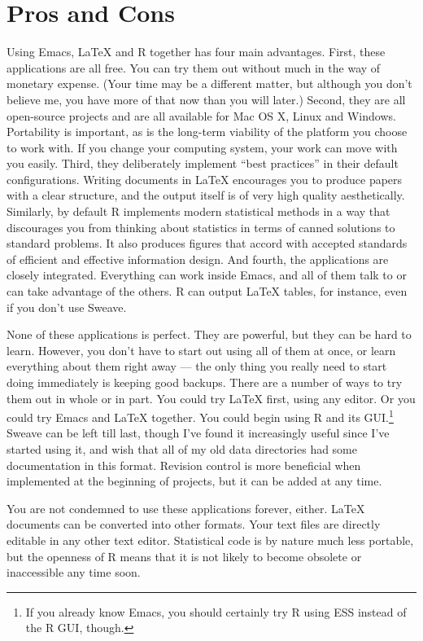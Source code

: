 \documentclass[11pt,article,oneside]{memoir}
\begin{document}
\section{Pros and Cons}  
Using Emacs, LaTeX and R together has four main advantages. First, these applications are all free. You can try them out without much in the way of monetary expense. (Your time may be a different matter, but although you don't believe me, you have more of that now than you will later.) Second, they are all open-source projects and are all available for Mac OS X, Linux and Windows. Portability is important, as is the long-term viability of the platform you choose to work with. If you change your computing system, your work can move with you easily. Third, they deliberately implement ``best practices'' in their default configurations. Writing documents in LaTeX encourages you to produce papers with a clear structure, and the output itself is of very high quality aesthetically. Similarly, by default R implements modern statistical methods in a way that discourages you from thinking about statistics in terms of canned solutions to standard problems. It also produces figures that accord with accepted standards of efficient and effective information design. And fourth, the applications are closely integrated. Everything can work inside Emacs, and all of them talk to or can take advantage of the others. R can output LaTeX tables, for instance, even if you don't use Sweave.

None of these applications is perfect. They are powerful, but they can be hard to learn. However, you don't have to start out using all of them at once, or learn everything about them right away --- the only thing you really need to start doing immediately is keeping good backups. There are a number of ways to try them out in whole or in part. You could try LaTeX first, using any editor. Or you could try Emacs and LaTeX together. You could begin using R and its GUI.\footnote{If you already know Emacs, you should certainly try R using ESS instead of the R GUI, though.} Sweave can be left till last, though I've found it increasingly useful since I've started using it, and wish that all of my old data directories had some documentation in this format. Revision control is more beneficial when implemented at the beginning of projects, but it can be added at any time. 

You are not condemned to use these applications forever, either. LaTeX documents can be converted into other formats. Your text files are directly editable in any other text editor. Statistical code is by nature much less portable, but the openness of R means that it is not likely to become obsolete or inaccessible any time soon.
\end{document}
